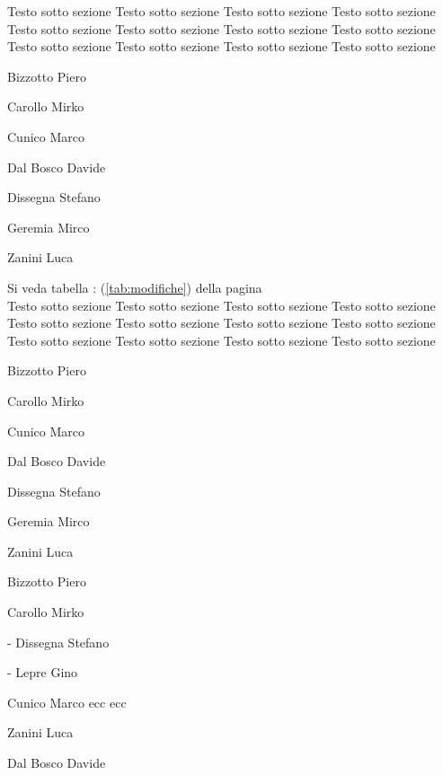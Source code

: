 Testo sotto sezione 	Testo sotto sezione Testo sotto sezione 	Testo sotto sezione Testo sotto sezione 	Testo sotto sezione
Testo sotto sezione 	Testo sotto sezione Testo sotto sezione 	Testo sotto sezione Testo sotto sezione 	Testo sotto sezione
	\begin{elenconumerato}{\subsecindent}
		\item Bizzotto Piero
		\item Carollo Mirko
		\item Cunico Marco
		\item Dal Bosco Davide
		\item Dissegna Stefano
		\item Geremia Mirco
		\item Zanini Luca
	\end{elenconumerato}
	Si veda tabella : (\ref{tab:modifiche}) della pagina~\pageref{tab:modifiche}\\

Testo sotto sezione 	Testo sotto sezione Testo sotto sezione 	Testo sotto sezione Testo sotto sezione 	Testo sotto sezione
Testo sotto sezione 	Testo sotto sezione Testo sotto sezione 	Testo sotto sezione Testo sotto sezione 	Testo sotto sezione
	\begin{elenconumerato}{\subsubsecindent}
		\item Bizzotto Piero
		\item Carollo Mirko
			\begin{elenconumerato}{\normindent}
				\item Cunico Marco
				\item Dal Bosco Davide
			\end{elenconumerato}
		\item Dissegna Stefano
		\item Geremia Mirco
		\item Zanini Luca
	\end{elenconumerato}
	
	\begin{elencopuntato}[\subsubsecindent]
		\item Bizzotto Piero
		\item Carollo Mirko
			\begin{elencopuntato}[\normindent]
				\item[-] Dissegna Stefano
				\item[-] Lepre Gino
			\end{elencopuntato}
		\item Cunico Marco ecc ecc
		\item Zanini Luca
		\item Dal Bosco Davide
	\end{elencopuntato}

